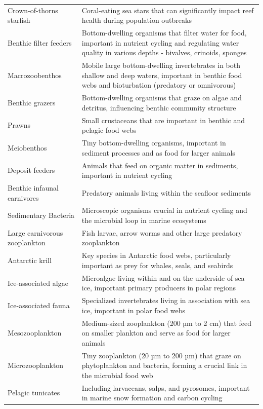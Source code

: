 \begin{longtable}{p{}p{}}
  Crown-of-thorns starfish & Coral-eating sea stars that can significantly impact reef health during population outbreaks \\
  Benthic filter feeders & Bottom-dwelling organisms that filter water for food, important in nutrient cycling and regulating water quality in various depths - bivalves, crinoids, sponges \\
  Macrozoobenthos & Mobile large bottom-dwelling invertebrates in both shallow and deep waters, important in benthic food webs and bioturbation (predatory or omnivorous) \\
  Benthic grazers & Bottom-dwelling organisms that graze on algae and detritus, influencing benthic community structure \\
  Prawns & Small crustaceans that are important in benthic and pelagic food webs \\
  Meiobenthos & Tiny bottom-dwelling organisms, important in sediment processes and as food for larger animals \\
  Deposit feeders & Animals that feed on organic matter in sediments, important in nutrient cycling \\
  Benthic infaunal carnivores & Predatory animals living within the seafloor sediments \\
  Sedimentary Bacteria & Microscopic organisms crucial in nutrient cycling and the microbial loop in marine ecosystems \\
  Large carnivorous zooplankton & Fish larvae, arrow worms and other large predatory zooplankton \\
  Antarctic krill & Key species in Antarctic food webs, particularly important as prey for whales, seals, and seabirds \\
  Ice-associated algae & Microalgae living within and on the underside of sea ice, important primary producers in polar regions \\
  Ice-associated fauna & Specialized invertebrates living in association with sea ice, important in polar food webs \\
  Mesozooplankton & Medium-sized zooplankton (200 µm to 2 cm) that feed on smaller plankton and serve as food for larger animals \\
  Microzooplankton & Tiny zooplankton (20 µm to 200 µm) that graze on phytoplankton and bacteria, forming a crucial link in the microbial food web \\
  Pelagic tunicates & Including larvaceans, salps, and pyrosomes, important in marine snow formation and carbon cycling \\

\end{longtable}
